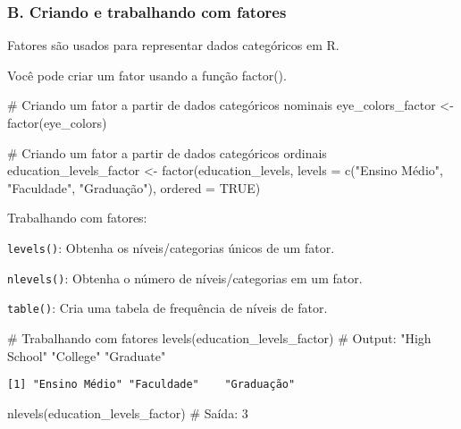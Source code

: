 \documentclass[
  letterpaper,
  DIV=11,
  numbers=noendperiod]{scrartcl}
\newenvironment{Shaded}{\begin{snugshade}}{\end{snugshade}}
\newcommand{\AttributeTok}[1]{\textcolor[rgb]{0.40,0.45,0.13}{#1}}
\newcommand{\CommentTok}[1]{\textcolor[rgb]{0.37,0.37,0.37}{#1}}
\newcommand{\ConstantTok}[1]{\textcolor[rgb]{0.56,0.35,0.01}{#1}}
\newcommand{\FunctionTok}[1]{\textcolor[rgb]{0.28,0.35,0.67}{#1}}
\newcommand{\NormalTok}[1]{\textcolor[rgb]{0.00,0.23,0.31}{#1}}
\newcommand{\OtherTok}[1]{\textcolor[rgb]{0.00,0.23,0.31}{#1}}
\newcommand{\StringTok}[1]{\textcolor[rgb]{0.13,0.47,0.30}{#1}}
\begin{document}
\hypertarget{b.-criando-e-trabalhando-com-fatores}{%
\subsubsection{B. Criando e trabalhando com
fatores}\label{b.-criando-e-trabalhando-com-fatores}}

Fatores são usados para representar dados categóricos em R.

Você pode criar um fator usando a função factor().

\begin{Shaded}
\begin{Highlighting}[]
\CommentTok{\# Criando um fator a partir de dados categóricos nominais}
\NormalTok{eye\_colors\_factor }\OtherTok{\textless{}{-}} \FunctionTok{factor}\NormalTok{(eye\_colors)}

\CommentTok{\# Criando um fator a partir de dados categóricos ordinais}
\NormalTok{education\_levels\_factor }\OtherTok{\textless{}{-}} \FunctionTok{factor}\NormalTok{(education\_levels, }\AttributeTok{levels =} \FunctionTok{c}\NormalTok{(}\StringTok{"Ensino Médio"}\NormalTok{, }\StringTok{"Faculdade"}\NormalTok{, }\StringTok{"Graduação"}\NormalTok{), }\AttributeTok{ordered =} \ConstantTok{TRUE}\NormalTok{)}
\end{Highlighting}
\end{Shaded}

Trabalhando com fatores:

\texttt{levels()}: Obtenha os níveis/categorias únicos de um fator.

\texttt{nlevels()}: Obtenha o número de níveis/categorias em um fator.

\texttt{table()}: Cria uma tabela de frequência de níveis de fator.

\begin{Shaded}
\begin{Highlighting}[]
\CommentTok{\# Trabalhando com fatores}
\FunctionTok{levels}\NormalTok{(education\_levels\_factor) }\CommentTok{\# Output: "High School" "College" "Graduate"}
\end{Highlighting}
\end{Shaded}

\begin{verbatim}
[1] "Ensino Médio" "Faculdade"    "Graduação"   
\end{verbatim}

\begin{Shaded}
\begin{Highlighting}[]
\FunctionTok{nlevels}\NormalTok{(education\_levels\_factor) }\CommentTok{\# Saída: 3}
\end{Highlighting}
\end{Shaded}
\end{document}
